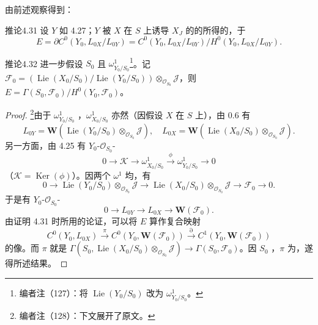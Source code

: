 由前述观察得到：
\begin{SGAresult}{推论}{4.31}
设 $Y$ 如 4.27；$Y$ 被 $X$ 在 $S$ 上诱导 $X_J$ 的的所得的，于
\[E=\partial C^0(Y_0,L_{0X}/L_{0Y})=C^0(Y_0,L_{0X}/L_{0Y})/H^0(Y_0,L_{0X}/L_{0Y}).\]
\end{SGAresult}
\begin{SGAresult}{推论}{4.32}
进一步假设 $S_0$ 且 $\omega^1_{Y_0/S_0}$\footnote{编者注（127）：将 $\operatorname{Lie}(Y_0/S_0)$ 改为 $\omega^1_{Y_0/S_0}$。}。记 $\mathscr F_0=(\operatorname{Lie}(X_0/S_0)/\operatorname{Lie}(Y_0/S_0))\otimes_{\mathscr O_{S_0}}\mathscr J$，则 $E=\Gamma(S_0,\mathscr F_0)/H^0(Y_0,\mathscr F_0)$。
\end{SGAresult}
\begin{proof}
\footnote{编者注（128）：下文展开了原文。}由于 $\omega^1_{Y_0/S_0}$ ，$\omega^1_{X_0/S_0}$ 亦然（因假设 $X$ 在 $S$ 上），由 0.6 有
\[L_{0Y}=\mathbf W(\operatorname{Lie}(Y_0/S_0)\otimes_{\mathscr O_{S_0}}\mathscr J),\quad L_{0X}=\mathbf W(\operatorname{Lie}(X_0/S_0)\otimes_{\mathscr O_{S_0}}\mathscr J).\]
另一方面，由 4.25 有 $Y_0$-$\mathscr O_{S_0}$-
\[0\longrightarrow\mathscr K\longrightarrow\omega^1_{X_0/S_0}\xrightarrow\phi\omega^1_{Y_0/S_0}\longrightarrow0\]
（$\mathscr K=\operatorname{Ker}(\phi)$）。因两个 $\omega^1$ 均，有
\[0\longrightarrow\operatorname{Lie}(Y_0/S_0)\otimes_{\mathscr O_{S_0}}\mathscr J\longrightarrow\operatorname{Lie}(X_0/S_0)\otimes_{\mathscr O_{S_0}}\mathscr J\longrightarrow\mathscr F_0\longrightarrow0.\]
于是有 $Y_0$-$\mathscr O_{S_0}$-
\[0\longrightarrow L_{0Y}\longrightarrow L_{0X}\longrightarrow\mathbf W(\mathscr F_0).\]
由证明 4.31 时所用的论证，可以将 $E$ 算作复合映射
\[C^0(Y_0,L_{0X})\xrightarrow\pi C^0(Y_0,\mathbf W(\mathscr F_0))\xrightarrow\partial C^1(Y_0,\mathbf W(\mathscr F_0))\]
的像。而 $\pi$ 就是 $\Gamma(S_0,\operatorname{Lie}(X_0/S_0)\otimes_{\mathscr O_{S_0}}\mathscr J)\to\Gamma(S_0,\mathscr F_0)$。因 $S_0$ ，$\pi$ 为，遂得所述结果。
\end{proof}
